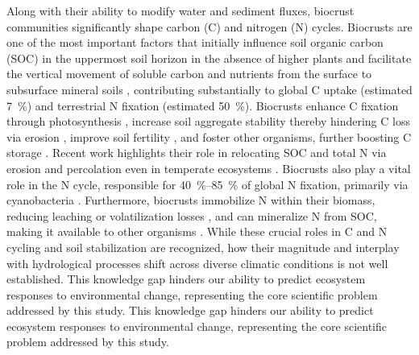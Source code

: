 Along with their ability to modify water and sediment fluxes, biocrust communities significantly shape carbon (C) and nitrogen (N) cycles. Biocrusts are one of the most important factors that initially influence soil organic carbon (SOC) in the uppermost soil horizon in the absence of higher plants \citep{Belnap2007} and facilitate the vertical movement of soluble carbon and nutrients from the surface to subsurface mineral soils \citep{Young2022}, contributing substantially to global C uptake (estimated \SI{7}{\percent}) and terrestrial N fixation (estimated \SI{50}{\percent})\citep{Elbert2012}. Biocrusts enhance C fixation through photosynthesis \citep{Barger2016,Grote2010}, increase soil aggregate stability thereby hindering C loss via erosion \citep{Riveras-Munoz2022,Xiao2022}, improve soil fertility \citep{Kheirfam2017}, and foster other organisms, further boosting C storage \citep{MolinaMontenegro2016}. Recent work highlights their role in relocating SOC and total N via erosion and percolation even in temperate ecosystems \citep{Gall2024}. Biocrusts also play a vital role in the N cycle, responsible for \SIrange[range-phrase=--,range-units=single]{40}{85}{\percent} of global N fixation, primarily via cyanobacteria \citep{RodriguezCaballero2018b,Samolov2020}. Furthermore, biocrusts immobilize N within their biomass, reducing leaching or volatilization losses \citep{Nevins2020,Pan2021}, and can mineralize N from SOC, making it available to other organisms \citep{Weber2015}. While these crucial roles in C and N cycling and soil stabilization are recognized, how their magnitude and interplay with hydrological processes shift across diverse climatic conditions is not well established. This knowledge gap hinders our ability to predict ecosystem responses to environmental change, representing the core scientific problem addressed by this study. This knowledge gap hinders our ability to predict ecosystem responses to environmental change, representing the core scientific problem addressed by this study.

